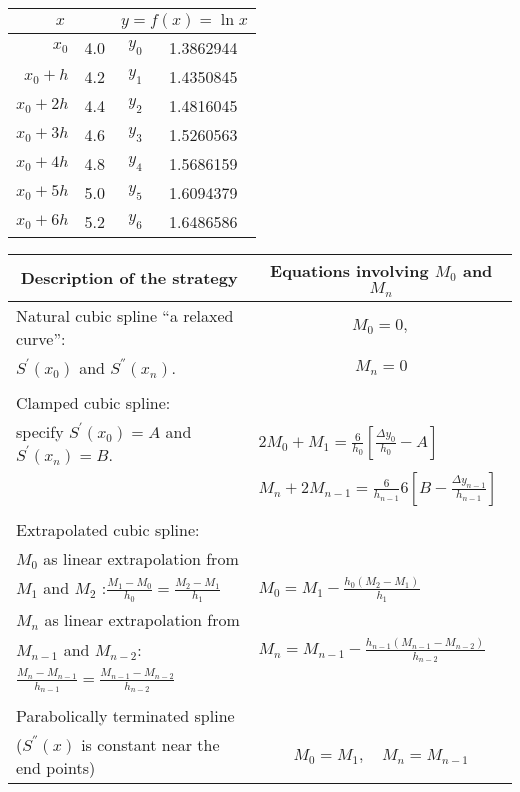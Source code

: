 \documentclass[12pt,class=book,crop=false]{standalone}
\begin{document}
\begin{table}[H]
    \centering
    \begin{tabular}{r@{ = }S[table-format=1.2]r@{ = }S[table-format=1.7]}
        \toprule
                  &  \\\midrule
        $ x_0$& 4.0 & $y_0$ &1.3862944  \\
        $ x_0+h$&4.2   & $ y_1$& 1.4350845 \\
        $ x_0+2h$&4.4  & $ y_2$& 1.4816045 \\
        $ x_0+3h$&4.6  & $ y_3$& 1.5260563 \\
        $ x_0+4h$&4.8  & $ y_4$& 1.5686159 \\
        $ x_0+5h$&5.0  & $ y_5$& 1.6094379 \\
        $ x_0+6h$&5.2  & $ y_6$& 1.6486586  \\\bottomrule
    \end{tabular}
\end{table}
\begin{table}[H]
	\centering
	\begin{tabular}{ll}
		\toprule
		\multicolumn{1}{c}{Description of the strategy}&\multicolumn{1}{c}{ Equations involving $ M_0 $ and $ M_n $ }\\\midrule
		
        Natural cubic spline ``a relaxed curve'': & \multicolumn{1}{c}{$ M_0=0,$}\\
		$ S^{'}(x_0) $ and $ S^{''}(x_n )$. & \multicolumn{1}{c}{$M_n=0 $ }\\%
		&\\
        Clamped cubic spline:& \\
		specify $ S^{'} (x_0) = A $ and $ S^{'} (x_n) = B $. & $\displaystyle 2M_0+M_1 =\frac{6}{h_0}\left[ \frac{\Delta y_0}{h_0}-A \right]$\\
					& $\displaystyle M_n+2M_{n-1} =\frac{6}{h_{n-1}}6\left[ B-\frac{\Delta y_{n-1}}{h_{n-1}} \right] $      \\%
		& \\
        Extrapolated cubic spline:& \\
		$ M_0 $ as linear extrapolation from & \\
		$ M_1 $ and $ M_2 $ :$ \frac{M_1-M_0}{h_0}=\frac{M_2-M_1}{h_1} $ & $\displaystyle M_0 =M_1-\frac{h_0 (M_2-M_1)}{h_1}$\\
		$ M_n $ as linear extrapolation from & \\
		$ M_{n-1} $ and $ M_{n-2} $: & $\displaystyle M_n  =M_{n-1}-\frac{h_{n-1}(M_{n-1}-M_{n-2})}{h_{n-2}}$\\
		$\displaystyle \frac{M_n-M_{n-1}}{h_{n-1}}=\frac{M_{n-1}-M_{n-2}}{h_{n-2}} $ & \\%
		& \\
        Parabolically terminated spline & \\
		($ S^{''}(x) $ is constant near the end points)&\multicolumn{1}{c}{ $ M_0=M_1,\quad M_n=M_{n-1} $}\\\bottomrule
	\end{tabular}
\end{table}
\end{document}
